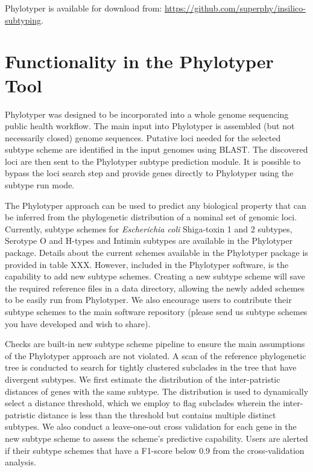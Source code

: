 \documentclass{bioinfo}
\begin{document}
Phylotyper is available for download from: \url{https://github.com/superphy/insilico-subtyping}.

\section{Functionality in the Phylotyper Tool}

Phylotyper was designed to be incorporated into a whole genome sequencing public health workflow.  
The main input into Phylotyper is assembled (but not necessarily closed) genome sequences.  
Putative loci needed for the selected subtype scheme are identified in the input genomes using BLAST.
The discovered loci are then sent to the Phylotyper subtype prediction module.
It is possible to bypass the loci search step and provide genes directly to Phylotyper using the subtype run mode.

The Phylotyper approach can be used to predict any biological property that can be inferred from the phylogenetic distribution of a nominal set of genomic loci.
Currently, subtype schemes for \emph{Escherichia coli} Shiga-toxin 1 and 2 subtypes, Serotype O and H-types and Intimin subtypes are available in the Phylotyper package.
Details about the current schemes available in the Phylotyper package is provided in table XXX.
However, included in the Phylotyper software, is the capability to add new subtype schemes. 
Creating a new subtype scheme will save the required reference files in a data directory, allowing the newly added schemes to be easily run from Phylotyper. 
We also encourage users to contribute their subtype schemes to the main software repository (please send us subtype schemes you have developed and wish to share).

Checks are built-in new subtype scheme pipeline to ensure the main assumptions of the Phylotyper approach are not violated.  
A scan of the reference phylogenetic tree is conducted to search for tightly clustered subclades in the tree that have divergent subtypes.
We first estimate the distribution of the inter-patristic distances of genes with the same subtype.  
The distribution is used to dynamically select a distance threshold, which we employ to flag subclades wherein the inter-patristic distance is less than  the threshold but contains multiple distinct subtypes.
We also conduct a leave-one-out cross validation for each gene in the new subtype scheme to assess the scheme's predictive capability.
Users are alerted if their subtype schemes that have a F1-score below 0.9 from the cross-validation analysis.
\end{document}
